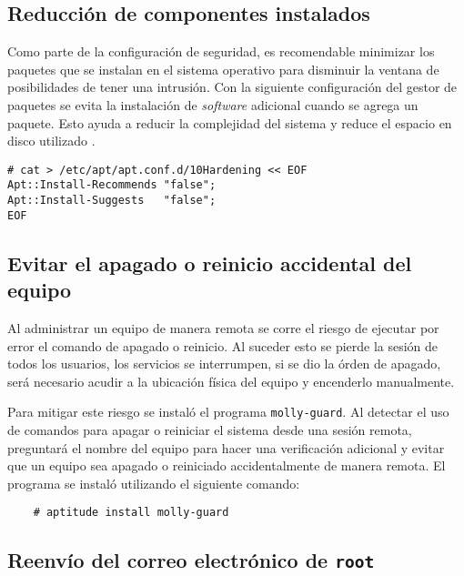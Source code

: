       \subsection {Reducci\'{o}n de componentes instalados}

Como parte de la configuraci\'{o}n de seguridad, es recomendable minimizar los paquetes que se instalan en el sistema operativo para disminuir la ventana de posibilidades de tener una intrusi\'{o}n. Con la siguiente configuraci\'{o}n del gestor de paquetes se evita la instalaci\'{o}n de \textit{software} adicional cuando se agrega un paquete. Esto ayuda a reducir la complejidad del sistema y reduce el espacio en disco utilizado \cite{_configuration_????}.

{
\scriptsize
\linespread{1}
\begin{verbatim}
# cat > /etc/apt/apt.conf.d/10Hardening << EOF
Apt::Install-Recommends "false";
Apt::Install-Suggests   "false";
EOF
\end{verbatim}
}

      \subsection {Evitar el apagado o reinicio accidental del equipo}

Al administrar un equipo de manera remota se corre el riesgo de ejecutar por error el comando de apagado o reinicio. Al suceder esto se pierde la sesi\'{o}n de todos los usuarios, los servicios se interrumpen, si se dio la \'{o}rden de apagado, ser\'{a} necesario acudir a la ubicaci\'{o}n f\'{i}sica del equipo y encenderlo manualmente.

Para mitigar este riesgo se instal\'{o} el programa \texttt{molly-guard}. Al detectar el uso de comandos para apagar o reiniciar el sistema desde una sesi\'{o}n remota, preguntar\'{a} el nombre del equipo para hacer una verificaci\'{o}n adicional y evitar que un equipo sea apagado o reiniciado accidentalmente de manera remota. El programa se instal\'{o} utilizando el siguiente comando:

{
\scriptsize
\linespread{1}
\begin{verbatim}
    # aptitude install molly-guard
\end{verbatim}
}

      \subsection {Reenv\'{i}o del correo electr\'{o}nico de \texttt{root}}

